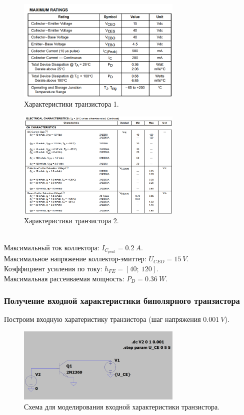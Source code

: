 \documentclass[12pt]{article}
\begin{document}
\begin{figure}[H]
    \centering
    \includegraphics[width=0.7\textwidth]{transistor_datasheet_1.png}
    \caption{Характеристики транзистора 1.}
    \label{fig:transistor_datasheet_1.png}
\end{figure}
\begin{figure}[H]
    \centering
    \includegraphics[width=0.7\textwidth]{transistor_datasheet_2.png}
    \caption{Характеристики транзистора 2.}
    \label{fig:transistor_datasheet_2.png}
\end{figure}
\ \\
Максимальный ток коллектора: $I_{C_{peak}} = 0.2 \ A$.\\
Максимальное напряжение коллектор-эмиттер: $U_{CEO} = 15 \ V$.\\
Коэффициент усиления по току: $h_{FE} = [40; \ 120]$. \\
Максимальная рассеиваемая мощность: $P_D = 0.36 \ W$.\\

\subsubsection*{Получение входной характеристики биполярного транзистора}
Построим входную харатеристику транзистора (шаг напряжения $0.001 \ V$).
\begin{figure}[H]
    \centering
    \includegraphics[width=0.7\textwidth]{1_scheme.png}
    \caption{Схема для моделирования входной характеристики транзистора.}
    \label{fig:1_scheme.png}
\end{figure}\\
\end{document}
